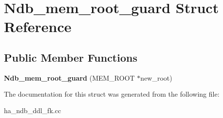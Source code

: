 \hypertarget{structNdb__mem__root__guard}{}\section{Ndb\+\_\+mem\+\_\+root\+\_\+guard Struct Reference}
\label{structNdb__mem__root__guard}
\subsection*{Public Member Functions}
\begin{DoxyCompactItemize}
\item 
\mbox{\label{structNdb__mem__root__guard_a26cd86565d20ec3021015899d78c41c3}} 
{\bfseries Ndb\+\_\+mem\+\_\+root\+\_\+guard} (M\+E\+M\+\_\+\+R\+O\+OT $\ast$new\+\_\+root)
\end{DoxyCompactItemize}


The documentation for this struct was generated from the following file\+:\begin{DoxyCompactItemize}
\item 
ha\+\_\+ndb\+\_\+ddl\+\_\+fk.\+cc\end{DoxyCompactItemize}
